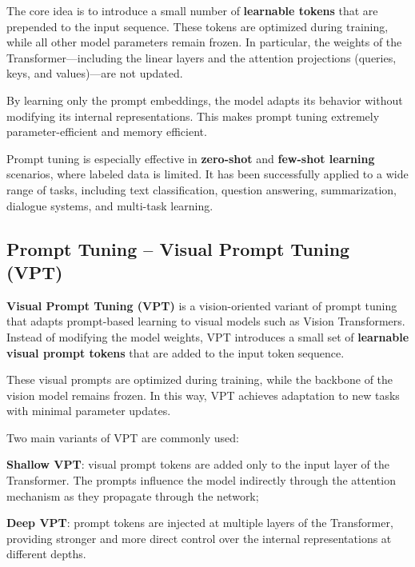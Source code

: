 The core idea is to introduce a small number of \textbf{learnable tokens} that are prepended to
the input sequence. These tokens are optimized during training, while all other model
parameters remain frozen. In particular, the weights of the Transformer—including the linear
layers and the attention projections (queries, keys, and values)—are not updated.

By learning only the prompt embeddings, the model adapts its behavior without modifying its
internal representations. This makes prompt tuning extremely parameter-efficient and memory
efficient.

Prompt tuning is especially effective in \textbf{zero-shot} and \textbf{few-shot learning}
scenarios, where labeled data is limited. It has been successfully applied to a wide range of
tasks, including text classification, question answering, summarization, dialogue systems, and
multi-task learning.

\subsection{Prompt Tuning -- Visual Prompt Tuning (VPT)}
\textbf{Visual Prompt Tuning (VPT)} is a vision-oriented variant of prompt tuning that adapts
prompt-based learning to visual models such as Vision Transformers. Instead of modifying the
model weights, VPT introduces a small set of \textbf{learnable visual prompt tokens} that are
added to the input token sequence.

These visual prompts are optimized during training, while the backbone of the vision model
remains frozen. In this way, VPT achieves adaptation to new tasks with minimal parameter updates.

Two main variants of VPT are commonly used:
\begin{compactitemize}
    \item \textbf{Shallow VPT}: visual prompt tokens are added only to the input layer of the
    Transformer. The prompts influence the model indirectly through the attention mechanism as
    they propagate through the network;
    \item \textbf{Deep VPT}: prompt tokens are injected at multiple layers of the Transformer,
    providing stronger and more direct control over the internal representations at different
    depths.
\end{compactitemize}

